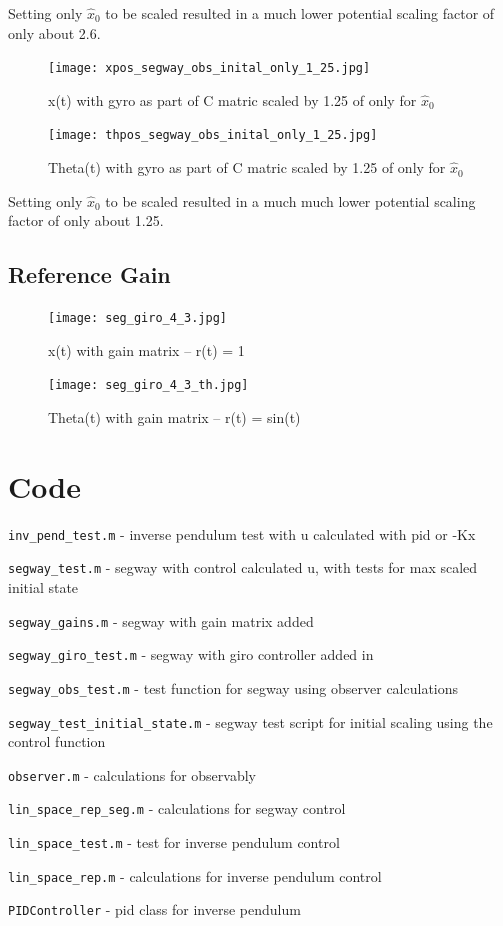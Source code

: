 \documentclass{article}
\begin{document}
Setting only $\hat{x}_0$ to be scaled resulted in a much lower potential scaling factor of only about 2.6.
\begin{figure}[H]
    \centering
    \texttt{[image: xpos\_segway\_obs\_inital\_only\_1\_25.jpg]}
    \caption{x(t) with gyro as part of C matric scaled by 1.25 of only for $\hat{x}_0$}
    \label{fig:x_segway}
\end{figure}

\begin{figure}[H]
    \centering
    \texttt{[image: thpos\_segway\_obs\_inital\_only\_1\_25.jpg]}
    \caption{Theta(t) with gyro as part of C matric scaled by 1.25 of only for $\hat{x}_0$}
    \label{fig:th_segway}
\end{figure}

Setting only $\hat{x}_0$ to be scaled resulted in a much much lower potential scaling factor of only about 1.25.

\subsection{Reference Gain}
\begin{figure}[H]
    \centering
    \texttt{[image: seg\_giro\_4\_3.jpg]}
    \caption{x(t) with gain matrix -- r(t) = 1}
    \label{fig:x_segway}
\end{figure}

\begin{figure}[H]
    \centering
    \texttt{[image: seg\_giro\_4\_3\_th.jpg]}
    \caption{Theta(t) with gain matrix -- r(t) = sin(t)}
    \label{fig:th_segway}
\end{figure}

\section{Code}
    \texttt{inv\_pend\_test.m} - inverse pendulum test with u calculated with pid or -Kx

    \texttt{segway\_test.m} - segway with control calculated u, with tests for max scaled initial state

    \texttt{segway\_gains.m} - segway with gain matrix added

    \texttt{segway\_giro\_test.m} - segway with giro controller added in

    \texttt{segway\_obs\_test.m} - test function for segway using observer calculations

    \texttt{segway\_test\_initial\_state.m} - segway test script for initial scaling using the control function

    \texttt{observer.m} - calculations for observably

    \texttt{lin\_space\_rep\_seg.m} - calculations for segway control

    \texttt{lin\_space\_test.m} - test for inverse pendulum control

    \texttt{lin\_space\_rep.m} - calculations for inverse pendulum control

    \texttt{PIDController} - pid class for inverse pendulum
\end{document}

